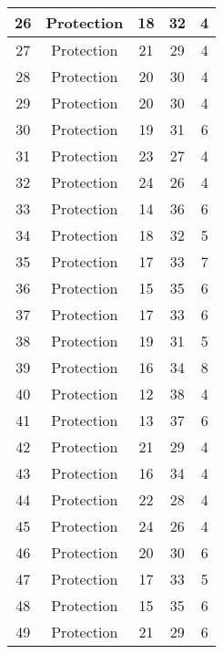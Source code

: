 \documentclass[results.tex]{subfiles}
\begin{document}
\begin{center}
\begin{tabular}{| c || c | c | c | c |}
    \hline
    26 & Protection & 18 & 32 & 4 \\ 
    \hline
    27 & Protection & 21 & 29 & 4 \\ 
    \hline
    28 & Protection & 20 & 30 & 4 \\ 
    \hline
    29 & Protection & 20 & 30 & 4 \\ 
    \hline
    30 & Protection & 19 & 31 & 6 \\ 
    \hline
    31 & Protection & 23 & 27 & 4 \\ 
    \hline
    32 & Protection & 24 & 26 & 4 \\ 
    \hline
    33 & Protection & 14 & 36 & 6 \\ 
    \hline
    34 & Protection & 18 & 32 & 5 \\ 
    \hline
    35 & Protection & 17 & 33 & 7 \\ 
    \hline
    36 & Protection & 15 & 35 & 6 \\ 
    \hline
    37 & Protection & 17 & 33 & 6 \\ 
    \hline
    38 & Protection & 19 & 31 & 5 \\ 
    \hline
    39 & Protection & 16 & 34 & 8 \\ 
    \hline
    40 & Protection & 12 & 38 & 4 \\ 
    \hline
    41 & Protection & 13 & 37 & 6 \\ 
    \hline
    42 & Protection & 21 & 29 & 4 \\ 
    \hline
    43 & Protection & 16 & 34 & 4 \\ 
    \hline
    44 & Protection & 22 & 28 & 4 \\ 
    \hline
    45 & Protection & 24 & 26 & 4 \\ 
    \hline
    46 & Protection & 20 & 30 & 6 \\ 
    \hline
    47 & Protection & 17 & 33 & 5 \\ 
    \hline
    48 & Protection & 15 & 35 & 6 \\ 
    \hline
    49 & Protection & 21 & 29 & 6 \\ 
    \hline   \end{tabular}
\end{center}
\end{document}
